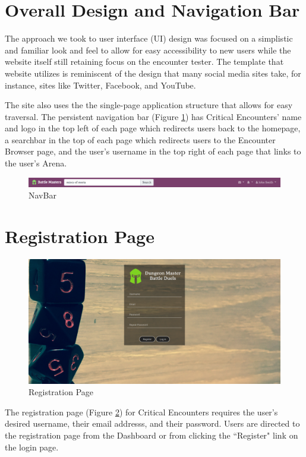 \documentclass[12pt,a4paper]{report}
\begin{document}
	\section{Overall Design and Navigation Bar}
	The approach we took to user interface (UI) design was focused on a simplistic and familiar look and feel to allow for easy accessibility to new users while the website itself still retaining focus on the encounter tester. The template that website utilizes is reminiscent of the design that many social media sites take, for instance, sites like Twitter, Facebook, and YouTube.\par
	The site also uses the the single-page application structure that allows for easy traversal. The persistent navigation bar (Figure \ref{fig: NavBar}) has Critical Encounters' name and logo in the top left of each page which redirects users back to the homepage, a searchbar in the top of each page which redirects users to the Encounter Browser page, and the user's username in the top right of each page that links to the user's Arena.
	\bigskip
	\bigskip
	\begin{figure}[H]
		\centering
		\centerline{\includegraphics[scale=.30]{navbar}}
		\caption{NavBar}
		\label{fig: NavBar}
	\end{figure}
	\section{Registration Page}
	\begin{figure}[H]
		\centering
		\includegraphics[scale=.20]{register}
		\caption{Registration Page}
		\label{fig: Registration Page}
	\end{figure}
	The registration page (Figure \ref{fig: Registration Page})  for Critical Encounters requires the user's desired username, their email addresss, and their password. Users are directed to the registration page from the Dashboard or from clicking the ``Register" link on the login page.
	\newpage
\end{document}
